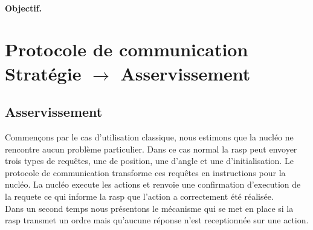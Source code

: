\documentclass[a4paper,10pt]{report}
\begin{document}
\begin{spacing}{1.5}
\paragraph{Objectif.}

\section{Protocole de communication Stratégie $\rightarrow$ Asservissement}
\subsection{Asservissement}
Commençons par le cas d'utilisation classique, nous estimons que la nucléo ne
rencontre aucun problème particulier. Dans ce cas normal la rasp peut envoyer trois
types de requêtes, une de position, une d'angle et une d'initialisation. Le
protocole de communication transforme ces requêtes en instructions pour la
nucléo. La nucléo execute les actions et renvoie une confirmation d'execution de
la requete ce qui informe la rasp que l'action a correctement été réalisée. \\
Dans un second temps nous présentons le mécanisme qui se met en place si la rasp
transmet un ordre mais qu'aucune réponse n'est receptionnée sur une action. \\
\begin{multicols}{2}
\begin{center}
\end{center}
\end{multicols}
\end{spacing}
\end{document}
